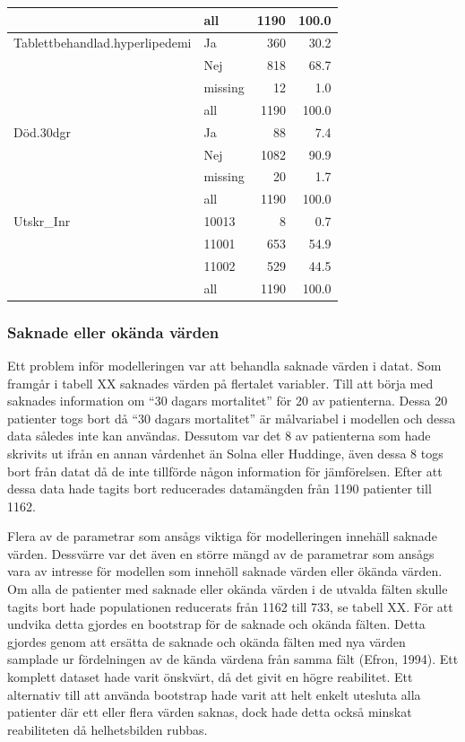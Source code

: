 \begin{table}[htbp]
{\begin{tabular}{ll|rr}
   \hline
 & all & 1190 & 100.0 \\ 
   \hline
\hline
Tablettbehandlad.hyperlipedemi & Ja & 360 & 30.2 \\ 
   & Nej & 818 & 68.7 \\ 
   & missing & 12 & 1.0 \\ 
   \hline
 & all & 1190 & 100.0 \\ 
   \hline
\hline
Död.30dgr & Ja & 88 & 7.4 \\ 
   & Nej & 1082 & 90.9 \\ 
   & missing & 20 & 1.7 \\ 
   \hline
 & all & 1190 & 100.0 \\ 
   \hline
\hline
Utskr\_Inr & 10013 & 8 & 0.7 \\ 
   & 11001 & 653 & 54.9 \\ 
   & 11002 & 529 & 44.5 \\ 
   \hline
 & all & 1190 & 100.0 \\ 
   \hline
\hline
\end{tabular}
}

\end{table}


\subsubsection{Saknade eller okända värden}
Ett problem inför modelleringen var att behandla saknade värden i datat. Som framgår i tabell XX saknades värden på flertalet variabler. Till att börja med saknades information om “30 dagars mortalitet” för 20 av patienterna. Dessa 20 patienter togs bort då “30 dagars mortalitet” är målvariabel i modellen och dessa data således inte kan användas. Dessutom var det 8 av patienterna som hade skrivits ut ifrån en annan vårdenhet än Solna eller Huddinge, även dessa 8 togs bort från datat då de inte tillförde någon information för jämförelsen. Efter att dessa data hade tagits bort reducerades datamängden från 1190 patienter till 1162.

Flera av de parametrar som ansågs viktiga för modelleringen innehäll saknade värden. Dessvärre var det även en större mängd av de parametrar som ansågs vara av intresse för modellen som innehöll saknade värden eller ökända värden. Om alla de patienter med saknade eller okända värden i de utvalda fälten skulle tagits bort hade populationen reducerats från 1162 till 733, se tabell XX. För att undvika detta gjordes en bootstrap för de saknade och okända fälten. Detta gjordes genom att ersätta de saknade och okända fälten med nya värden samplade ur fördelningen av de kända värdena från samma fält (Efron, 1994). Ett komplett dataset hade varit önskvärt, då det givit en högre reabilitet. Ett alternativ till att använda bootstrap hade varit att helt enkelt utesluta alla patienter där ett eller flera värden saknas, dock hade detta också minskat reabiliteten då helhetsbilden rubbas. 

